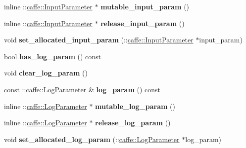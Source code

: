 \begin{DoxyCompactItemize}
inline \+::\mbox{\hyperlink{classcaffe_1_1_input_parameter}{caffe\+::\+Input\+Parameter}} $\ast$ {\bfseries mutable\+\_\+input\+\_\+param} ()
\item 
\mbox{\label{classcaffe_1_1_layer_parameter_a2a64fbddfa93954ae51fde88a6f6d281}} 
inline \+::\mbox{\hyperlink{classcaffe_1_1_input_parameter}{caffe\+::\+Input\+Parameter}} $\ast$ {\bfseries release\+\_\+input\+\_\+param} ()
\item 
\mbox{\label{classcaffe_1_1_layer_parameter_a39326b02be27b9f4a0dc71d50d7e20a3}} 
void {\bfseries set\+\_\+allocated\+\_\+input\+\_\+param} (\+::\mbox{\hyperlink{classcaffe_1_1_input_parameter}{caffe\+::\+Input\+Parameter}} $\ast$input\+\_\+param)
\item 
\mbox{\label{classcaffe_1_1_layer_parameter_ac2f79f40933d71c1d5865a0622e3cdcc}} 
bool {\bfseries has\+\_\+log\+\_\+param} () const
\item 
\mbox{\label{classcaffe_1_1_layer_parameter_a4d36d5aa346fd1110996ff6dc3e17944}} 
void {\bfseries clear\+\_\+log\+\_\+param} ()
\item 
\mbox{\label{classcaffe_1_1_layer_parameter_aabddb58f28500ece24057181630bb5e6}} 
const \+::\mbox{\hyperlink{classcaffe_1_1_log_parameter}{caffe\+::\+Log\+Parameter}} \& {\bfseries log\+\_\+param} () const
\item 
\mbox{\label{classcaffe_1_1_layer_parameter_afa75052c3c2aeb12fb0875d534bc54c8}} 
inline \+::\mbox{\hyperlink{classcaffe_1_1_log_parameter}{caffe\+::\+Log\+Parameter}} $\ast$ {\bfseries mutable\+\_\+log\+\_\+param} ()
\item 
\mbox{\label{classcaffe_1_1_layer_parameter_a013a9fe477402a401da1c68d0ab2ac73}} 
inline \+::\mbox{\hyperlink{classcaffe_1_1_log_parameter}{caffe\+::\+Log\+Parameter}} $\ast$ {\bfseries release\+\_\+log\+\_\+param} ()
\item 
\mbox{\label{classcaffe_1_1_layer_parameter_ac0319e6c5f58e6c8f51d3ffd570ef7c3}} 
void {\bfseries set\+\_\+allocated\+\_\+log\+\_\+param} (\+::\mbox{\hyperlink{classcaffe_1_1_log_parameter}{caffe\+::\+Log\+Parameter}} $\ast$log\+\_\+param)

\end{DoxyCompactItemize}
